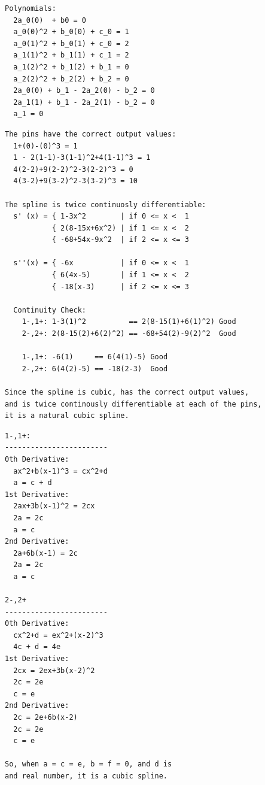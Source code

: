 \documentclass[12pt]{article}
\makeatletter
\theoremstyle{homework}
\newenvironment{exercise}[1]
{\def\@currentlabel{#1}\exercisecore}
{\endexercisecore}
\makeatother
\begin{document}
\begin{exercise}{Text 8.10}
\end{exercise}
\begin{verbatim}
Polynomials:
  2a_0(0)  + b0 = 0
  a_0(0)^2 + b_0(0) + c_0 = 1
  a_0(1)^2 + b_0(1) + c_0 = 2
  a_1(1)^2 + b_1(1) + c_1 = 2
  a_1(2)^2 + b_1(2) + b_1 = 0
  a_2(2)^2 + b_2(2) + b_2 = 0
  2a_0(0) + b_1 - 2a_2(0) - b_2 = 0
  2a_1(1) + b_1 - 2a_2(1) - b_2 = 0
  a_1 = 0
\end{verbatim}


\begin{exercise}{Text 8.12}
\end{exercise}
\begin{verbatim}
The pins have the correct output values:
  1+(0)-(0)^3 = 1 
  1 - 2(1-1)-3(1-1)^2+4(1-1)^3 = 1
  4(2-2)+9(2-2)^2-3(2-2)^3 = 0
  4(3-2)+9(3-2)^2-3(3-2)^3 = 10

The spline is twice continuosly differentiable:
  s' (x) = { 1-3x^2        | if 0 <= x <  1
           { 2(8-15x+6x^2) | if 1 <= x <  2
           { -68+54x-9x^2  | if 2 <= x <= 3
  
  s''(x) = { -6x           | if 0 <= x <  1
           { 6(4x-5)       | if 1 <= x <  2
           { -18(x-3)      | if 2 <= x <= 3

  Continuity Check:
    1-,1+: 1-3(1)^2          == 2(8-15(1)+6(1)^2) Good
    2-,2+: 2(8-15(2)+6(2)^2) == -68+54(2)-9(2)^2  Good

    1-,1+: -6(1)     == 6(4(1)-5) Good
    2-,2+: 6(4(2)-5) == -18(2-3)  Good

Since the spline is cubic, has the correct output values,
and is twice continously differentiable at each of the pins,
it is a natural cubic spline. 
\end{verbatim}

\begin{exercise}{Text 8.13}
\end{exercise}
\begin{verbatim}
1-,1+:
------------------------
0th Derivative:
  ax^2+b(x-1)^3 = cx^2+d
  a = c + d
1st Derivative:
  2ax+3b(x-1)^2 = 2cx
  2a = 2c
  a = c
2nd Derivative:
  2a+6b(x-1) = 2c
  2a = 2c
  a = c

2-,2+
------------------------
0th Derivative:
  cx^2+d = ex^2+(x-2)^3
  4c + d = 4e
1st Derivative:
  2cx = 2ex+3b(x-2)^2
  2c = 2e
  c = e
2nd Derivative: 
  2c = 2e+6b(x-2)
  2c = 2e
  c = e

So, when a = c = e, b = f = 0, and d is
and real number, it is a cubic spline.  
\end{verbatim}
\end{document}
